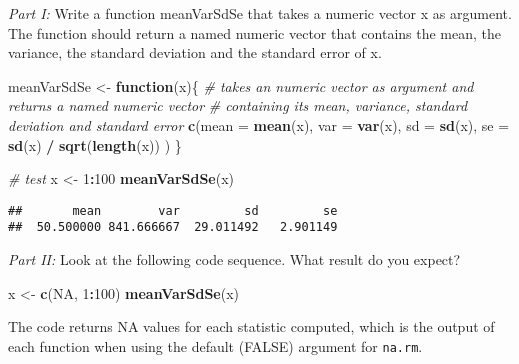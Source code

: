 \documentclass[12,]{article}
\newenvironment{Shaded}{\begin{snugshade}}{\end{snugshade}}
\newcommand{\KeywordTok}[1]{\textcolor[rgb]{0.13,0.29,0.53}{\textbf{#1}}}
\newcommand{\DataTypeTok}[1]{\textcolor[rgb]{0.13,0.29,0.53}{#1}}
\newcommand{\DecValTok}[1]{\textcolor[rgb]{0.00,0.00,0.81}{#1}}
\newcommand{\StringTok}[1]{\textcolor[rgb]{0.31,0.60,0.02}{#1}}
\newcommand{\CommentTok}[1]{\textcolor[rgb]{0.56,0.35,0.01}{\textit{#1}}}
\newcommand{\OtherTok}[1]{\textcolor[rgb]{0.56,0.35,0.01}{#1}}
\newcommand{\ControlFlowTok}[1]{\textcolor[rgb]{0.13,0.29,0.53}{\textbf{#1}}}
\newcommand{\OperatorTok}[1]{\textcolor[rgb]{0.81,0.36,0.00}{\textbf{#1}}}
\newcommand{\NormalTok}[1]{#1}
\begin{document}
\emph{Part I:} Write a function meanVarSdSe that takes a numeric vector
x as argument. The function should return a named numeric vector that
contains the mean, the variance, the standard deviation and the standard
error of x.

\begin{Shaded}
\begin{Highlighting}[]
\NormalTok{meanVarSdSe <-}\StringTok{ }\ControlFlowTok{function}\NormalTok{(x)\{}
  \CommentTok{# takes an numeric vector as argument and returns a named numeric vector }
  \CommentTok{# containing its mean, variance, standard deviation and standard error }
  \KeywordTok{c}\NormalTok{(}\DataTypeTok{mean =} \KeywordTok{mean}\NormalTok{(x),}
    \DataTypeTok{var =} \KeywordTok{var}\NormalTok{(x),}
    \DataTypeTok{sd =} \KeywordTok{sd}\NormalTok{(x),}
    \DataTypeTok{se =} \KeywordTok{sd}\NormalTok{(x) }\OperatorTok{/}\StringTok{ }\KeywordTok{sqrt}\NormalTok{(}\KeywordTok{length}\NormalTok{(x))}
\NormalTok{  )}
\NormalTok{\}}

\CommentTok{# test}
\NormalTok{x <-}\StringTok{ }\DecValTok{1}\OperatorTok{:}\DecValTok{100}
\KeywordTok{meanVarSdSe}\NormalTok{(x)}
\end{Highlighting}
\end{Shaded}

\begin{verbatim}
##       mean        var         sd         se 
##  50.500000 841.666667  29.011492   2.901149
\end{verbatim}

\vspace{1cm}

\emph{Part II:} Look at the following code sequence. What result do you
expect?

\begin{Shaded}
\begin{Highlighting}[]
\NormalTok{x <-}\StringTok{ }\KeywordTok{c}\NormalTok{(}\OtherTok{NA}\NormalTok{, }\DecValTok{1}\OperatorTok{:}\DecValTok{100}\NormalTok{)}
\KeywordTok{meanVarSdSe}\NormalTok{(x)}
\end{Highlighting}
\end{Shaded}

The code returns NA values for each statistic computed, which is the
output of each function when using the default (FALSE) argument for
\texttt{na.rm}.
\end{document}
